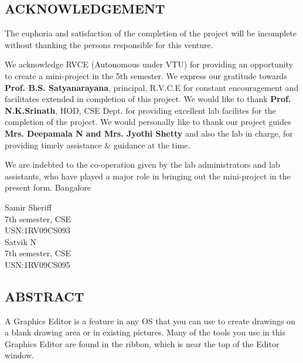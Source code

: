 \documentclass[12pt]{report}
\begin{document}
  
\setcounter{page}{1}
\begin{center}
\section*{ACKNOWLEDGEMENT}
\end{center}
The euphoria and satisfaction of the completion of the project will be incomplete
without thanking the persons responsible for this venture.


We acknowledge RVCE (Autonomous under VTU) for providing an opportunity to
create a mini-project in the 5th semester. We express our gratitude towards \textbf{Prof. B.S. Satyanarayana}, principal, R.V.C.E for constant encouragement and facilitates extended in completion of this project. We would like to thank \textbf{Prof. N.K.Srinath}, HOD, CSE
Dept. for providing excellent lab facilites for the completion of the project. We would
personally like to thank our project guides \textbf{Mrs. Deepamala N and Mrs. Jyothi Shetty} and also the lab in charge, for providing timely assistance \& guidance at the time.



We are indebted to the co-operation given by the lab administrators and lab assistants,
who have played a major role in bringing out the mini-project in the present form.
Bangalore



\begin{flushright}
Samir Sheriff\\
7th semester, CSE\\
USN:1RV09CS093\\

Satvik N\\
7th semester, CSE\\
USN:1RV09CS095\\

\end{flushright}

\newpage

\begin{center}
\section*{ABSTRACT}
\end{center} 
A Graphics Editor is a feature in any OS that you can use to create drawings on a blank drawing area or in existing pictures. Many of the tools you use in this Graphics Editor are found in the ribbon, which is near the top of the Editor window.
\end{document}
